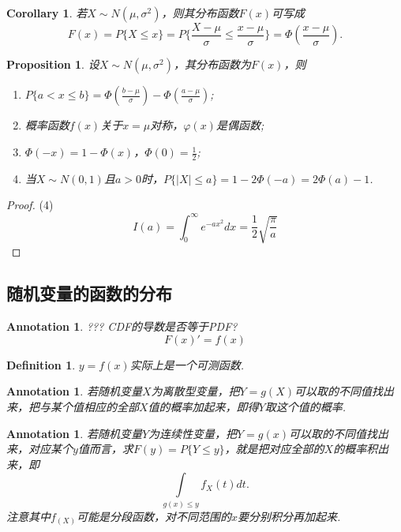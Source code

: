 \documentclass{article}
\newtheorem{corollary}[theorem]{Corollary}
\newtheorem{proposition}[theorem]{Proposition}
\newtheorem{definition}[theorem]{Definition}
\newtheorem{annotation}[theorem]{Annotation}
\begin{document}
\begin{corollary}
\rm 若$X \sim N(\mu,\sigma^2)$，则其分布函数$F(x)$可写成
$$
F(x) = P\{X \leq x \} = P\{ \frac{X-\mu}{\sigma} \leq \frac{x-\mu}{\sigma} \} = \Phi(\frac{x-\mu}{\sigma}). 
$$
\end{corollary}

\begin{proposition}
\rm 设$X \sim N(\mu,\sigma^2)$，其分布函数为$F(x)$，则
\begin{enumerate}
	\item $P\{a < x \leq b\} = \Phi(\frac{b-\mu}{\sigma}) - \Phi(\frac{a-\mu}{\sigma})$;
	\item 概率函数$f(x)$关于$x=\mu$对称，$\varphi(x)$是偶函数;
	\item $\Phi(-x) = 1-\Phi(x)$，$\Phi(0) = \frac{1}{2}$;
	\item 当$X \sim N(0,1)$且$a > 0$时，$P\{|X| \leq a\} = 1-2\Phi(-a) = 2\Phi(a) - 1$. 
\end{enumerate}
\end{proposition}

\begin{proof}
{\color{red}(4)}
$$
I(a)=\int_0^{\infty}e^{-ax^2}dx =\frac12 \sqrt{\frac{\pi}{a}}
$$
\end{proof}

\subsection{随机变量的函数的分布}


\begin{annotation}
\rm ??? CDF的导数是否等于PDF?
$$
F(x)' = f(x)
$$
\end{annotation}

\begin{definition}
\rm $y=f(x)$实际上是一个可测函数. 
\end{definition}

\begin{annotation}
\rm 若随机变量$X$为离散型变量，把$Y=g(X)$可以取的不同值找出来，把与某个值相应的全部$X$值的概率加起来，即得$Y$取这个值的概率.
\end{annotation}

\begin{annotation}
\rm 若随机变量$Y$为连续性变量，把$Y=g(x)$可以取的不同值找出来，对应某个$y$值而言，求$F(y) = P\{Y \leq y\}$，就是把对应全部的$X$的概率积出来，即
$$
\int\limits_{g(x) \leq y} f_X(t)dt.
$$
注意其中$f_(X)$可能是分段函数，对不同范围的$x$要分别积分再加起来. 
\end{annotation}
\end{document}
